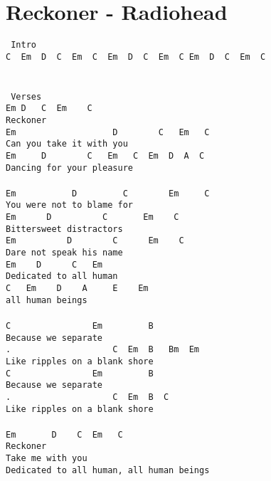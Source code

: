 \newpage
\section{Reckoner - Radiohead}
\label{Reckoner - Radiohead}
\texttt{\lbrack\ Intro\rbrack\\
C\ \ Em\ \ D\ \ C\ \ Em\ \ C\ \ Em\ \ D\ \ C\ \ Em\ \ C\ Em\ \ D\ \ C\ \ Em\ \ C\ \\
\\
\\
\lbrack\ Verses\rbrack\\
Em\ D\ \ \ C\ \ Em\ \ \ \ C\\
Reckoner\\
Em\ \ \ \ \ \ \ \ \ \ \ \ \ \ \ \ \ \ \ D\ \ \ \ \ \ \ \ C\ \ \ Em\ \ \ C\\
Can\ you\ take\ it\ with\ you\\
Em\ \ \ \ \ D\ \ \ \ \ \ \ \ C\ \ \ Em\ \ \ C\ \ Em\ \ D\ \ A\ \ C\\
Dancing\ for\ your\ pleasure\\
\\
Em\ \ \ \ \ \ \ \ \ \ \ D\ \ \ \ \ \ \ \ \ C\ \ \ \ \ \ \ \ Em\ \ \ \ \ C\\
You\ were\ not\ to\ blame\ for\\
Em\ \ \ \ \ \ D\ \ \ \ \ \ \ \ \ \ C\ \ \ \ \ \ \ Em\ \ \ \ C\ \\
Bittersweet\ distractors\\
Em\ \ \ \ \ \ \ \ \ \ D\ \ \ \ \ \ \ \ C\ \ \ \ \ \ Em\ \ \ \ C\\
Dare\ not\ speak\ his\ name\\
Em\ \ \ \ D\ \ \ \ \ \ C\ \ \ Em\ \ \ \\
Dedicated\ to\ all\ human\ \\
C\ \ \ Em\ \ \ \ D\ \ \ \ A\ \ \ \ \ E\ \ \ \ Em\\
all\ human\ beings\\
\\
C\ \ \ \ \ \ \ \ \ \ \ \ \ \ \ \ Em\ \ \ \ \ \ \ \ \ B\\
Because\ we\ separate\\
.\ \ \ \ \ \ \ \ \ \ \ \ \ \ \ \ \ \ \ \ C\ \ Em\ \ B\ \ \ Bm\ \ Em\\
Like\ ripples\ on\ a\ blank\ shore\\
C\ \ \ \ \ \ \ \ \ \ \ \ \ \ \ \ Em\ \ \ \ \ \ \ \ \ B\\
Because\ we\ separate\\
.\ \ \ \ \ \ \ \ \ \ \ \ \ \ \ \ \ \ \ \ C\ \ Em\ \ B\ \ C\\
Like\ ripples\ on\ a\ blank\ shore\\
\\
Em\ \ \ \ \ \ \ D\ \ \ \ C\ \ Em\ \ \ C\ \ \\
Reckoner\\
Take\ me\ with\ you\\
Dedicated\ to\ all\ human,\ all\ human\ beings}
